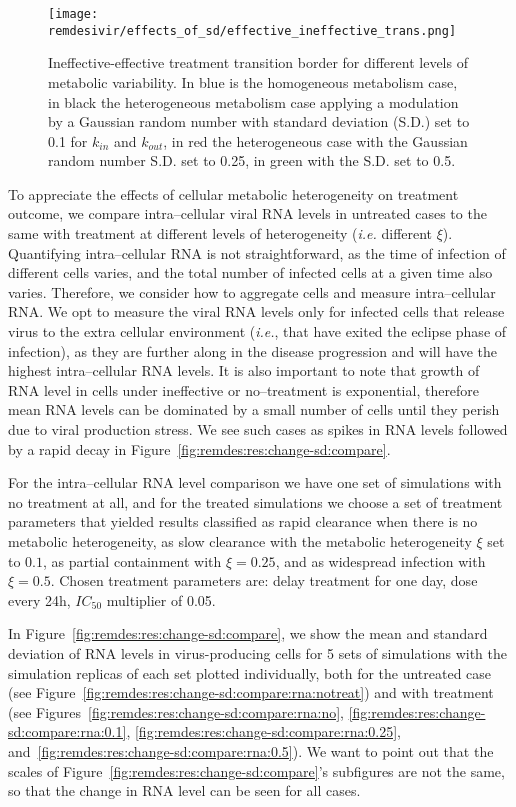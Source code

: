 \begin{figure}[H]
    \centering
    \texttt{[image: remdesivir/effects\_of\_sd/effective\_ineffective\_trans.png]}
    \caption{Ineffective-effective treatment transition border for different levels of metabolic variability. In blue is the homogeneous metabolism case, in black the heterogeneous metabolism case applying a modulation by a Gaussian random number with standard deviation (S.D.) set to 0.1 for $k_{in}$ and $k_{out}$, in red the heterogeneous case with the Gaussian random number S.D. set to 0.25, in green with the S.D. set to 0.5.}
    \label{fig:remdes:res:change-sd:boundary}
\end{figure}


To appreciate the effects of cellular metabolic heterogeneity on treatment outcome, we compare intra--cellular viral RNA levels in untreated cases to the same with treatment at different levels of heterogeneity (\textit{i.e.} different $\xi$). Quantifying intra--cellular RNA is not straightforward, as the time of infection of different cells varies, and the total number of infected cells at a given time also varies. Therefore, we consider how to aggregate cells and measure intra--cellular RNA. We opt to measure the viral RNA levels only for infected cells that release virus to the extra cellular environment (\textit{i.e.}, that have exited the eclipse phase of infection), as they are further along in the disease progression and will have the highest intra--cellular RNA levels. It is also important to note that growth of RNA level in cells under ineffective or no--treatment is exponential, therefore mean RNA levels can be dominated by a small number of cells until they perish due to viral production stress. We see such cases as spikes in RNA levels followed by a rapid decay in Figure~\ref{fig:remdes:res:change-sd:compare}.

For the intra--cellular RNA level comparison we have one set of simulations with no treatment at all, and for the treated simulations we choose a set of treatment parameters that yielded results classified as rapid clearance when there is no metabolic heterogeneity, as slow clearance with the metabolic heterogeneity $\xi$ set to $0.1$, as partial containment with $\xi=0.25$, and as widespread infection with $\xi=0.5$.  Chosen treatment parameters are: delay treatment for one day, dose every 24h, $IC_{50}$ multiplier of 0.05.

In Figure~\ref{fig:remdes:res:change-sd:compare}, we show the mean and standard deviation of RNA levels in virus-producing cells for 5 sets of simulations with the simulation replicas of each set plotted individually, both for the untreated case (see Figure~\ref{fig:remdes:res:change-sd:compare:rna:notreat}) and with treatment (see Figures~\ref{fig:remdes:res:change-sd:compare:rna:no}, \ref{fig:remdes:res:change-sd:compare:rna:0.1}, \ref{fig:remdes:res:change-sd:compare:rna:0.25}, and~\ref{fig:remdes:res:change-sd:compare:rna:0.5}). We want to point out that the scales of Figure~\ref{fig:remdes:res:change-sd:compare}'s subfigures are not the same, so that the change in RNA level can be seen for all cases.

